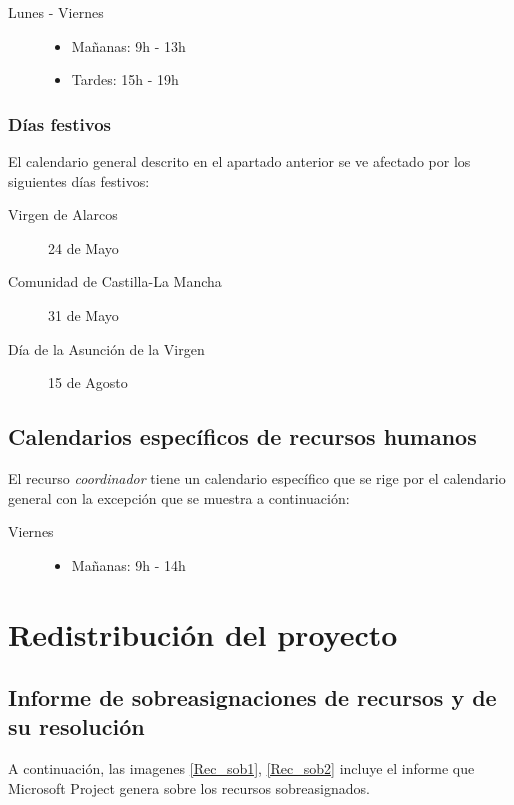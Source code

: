 \documentclass[11pt,a4paper,spanish,twoside]{book}
\begin{document}
\begin{description}
\item[Lunes - Viernes] \hfill
  \begin{itemize}
  \item Mañanas: 9h - 13h
  \item Tardes: 15h - 19h
  \end{itemize}
\end{description}

\subsection{Días festivos}
El calendario general descrito en el apartado anterior se ve afectado por los
siguientes días festivos:

\begin{description}
\item[Virgen de Alarcos] 24 de Mayo
\item[Comunidad de Castilla-La Mancha] 31 de Mayo
\item[Día de la Asunción de la Virgen] 15 de Agosto
\end{description}

\section{Calendarios específicos de recursos humanos}
El recurso \emph{coordinador} tiene un calendario específico que se rige por
el calendario general con la excepción que se muestra a continuación:

\begin{description}
\item[Viernes] \hfill
  \begin{itemize}
  \item Mañanas: 9h - 14h
  \end{itemize}
\end{description}


\chapter{Redistribución del proyecto}
\newpage
\section[Informe de sobreasignaciones]
{Informe de sobreasignaciones de recursos y de su resolución}
A continuación, las imagenes \ref{Rec_sob1}, \ref{Rec_sob2} incluye el
informe que Microsoft Project genera sobre los recursos sobreasignados.
\end{document}
